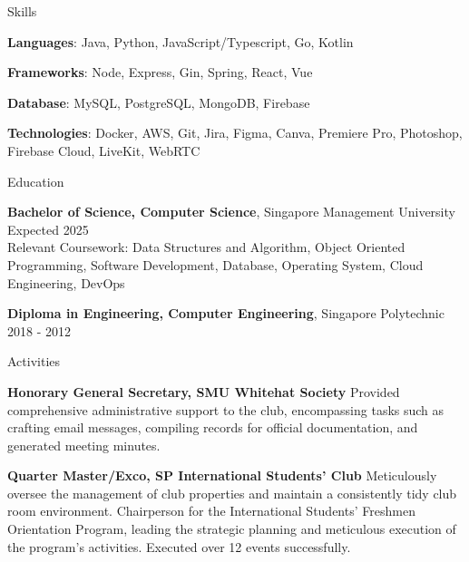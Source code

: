 \documentclass{resume} %
\begin{document}

\begin{rSection}{Skills}
\vspace{-1.25em}

\item \textbf{Languages}: {Java, Python, JavaScript/Typescript, Go, Kotlin}
\item \textbf{Frameworks}: {Node, Express, Gin, Spring, React, Vue}
\item \textbf{Database}: {MySQL, PostgreSQL, MongoDB, Firebase}
\item \textbf{Technologies}: {Docker, AWS, Git, Jira, Figma, Canva, Premiere Pro, Photoshop, Firebase Cloud, LiveKit, WebRTC}

\end{rSection}

\begin{rSection}{Education}

{\bf Bachelor of Science, Computer Science}, Singapore Management University \hfill {Expected 2025}\\
Relevant Coursework: Data Structures and Algorithm, Object Oriented Programming, Software Development, Database, Operating System, Cloud Engineering, DevOps

{\bf Diploma in Engineering, Computer Engineering}, Singapore Polytechnic \hfill {2018 - 2012}

\end{rSection}

\begin{rSection}{Activities} 
\vspace{-1.25em}

\item \textbf{Honorary General Secretary, SMU Whitehat Society} {Provided comprehensive administrative support to the club, encompassing tasks such as crafting email messages, compiling records for official documentation, and generated meeting minutes.}

\item \textbf{Quarter Master/Exco, SP International Students' Club} {Meticulously oversee the management of club properties and maintain a consistently tidy club room environment. Chairperson for the International Students' Freshmen Orientation Program, leading the strategic planning and meticulous execution of the program's activities. Executed over 12 events successfully.}

\end{rSection}
\end{document}
